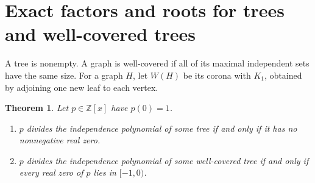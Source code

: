 \documentclass[11pt,a4paper]{article}
\newtheorem{theorem}{Theorem}[section]
\begin{document}
\section{Exact factors and roots for trees and well-covered trees}
\label{sec:tree-spectra}

A tree is nonempty. A graph is well-covered if all of its maximal
independent sets have the same size. For a graph $H$, let $W(H)$ be its
corona with $K_1$, obtained by adjoining one new leaf to each vertex.

\begin{theorem}\label{thm:tree-factors}
Let $p\in\mathbb Z[x]$ have $p(0)=1$.
\begin{enumerate}
\item $p$ divides the independence polynomial of some tree if and only if
it has no nonnegative real zero.
\item $p$ divides the independence polynomial of some well-covered tree
if and only if every real zero of $p$ lies in $[-1,0)$.
\end{enumerate}
\end{theorem}
\end{document}
